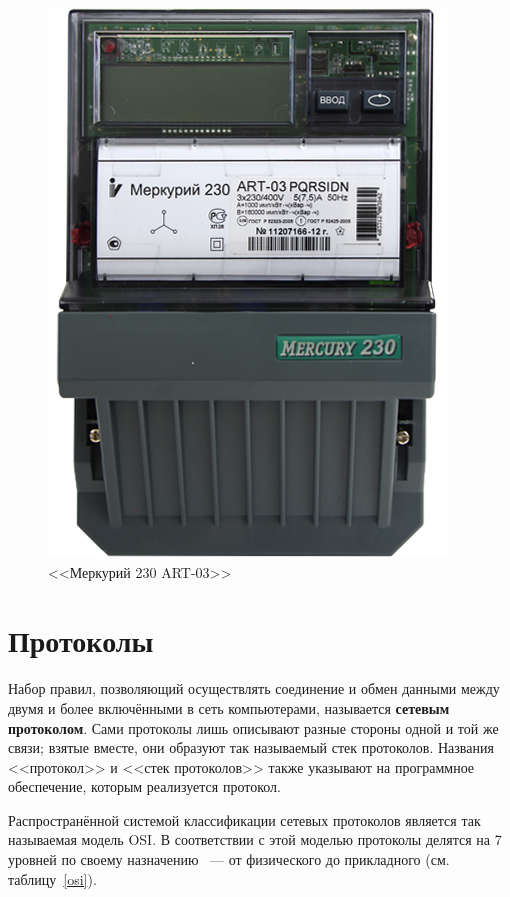 \begin{figure}[h]
	\label{mercury}
	\centering
		\includegraphics[scale=0.6]{img/mercury.png}
	\caption{<<Меркурий 230 ART-03>>}
\end{figure}

\fi

\newpage

\section{Протоколы}

Набор правил, позволяющий осуществлять соединение и обмен данными между двумя и более включёнными в сеть компьютерами, называется \textbf{сетевым протоколом}.
Сами протоколы лишь описывают разные стороны одной и той же связи; взятые вместе, они образуют так называемый стек протоколов. Названия <<протокол>> и <<стек протоколов>> также указывают на программное обеспечение, которым реализуется протокол\cite{protocols}.

Распространённой системой классификации сетевых протоколов является так называемая модель OSI. В соответствии с этой моделью протоколы делятся на 7 уровней по своему назначению ~--- от физического до прикладного (см. таблицу~\ref{osi}). 

